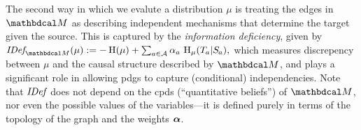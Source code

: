 \documentclass[twoside]{article}
\begin{document}
The second way in which we evalute a distribution $\mu$ is
treating the edges in ${\dg M}$ as describing independent mechanisms
that determine the target given the source.
This is captured by the \emph{information deficiency}, given by
$
    \IDef{\dg M}(\mu) := - \H(\mu) + \sum_{a \in \Ar} \alpha_a\, \H_\mu(\Tgt a | \Src a),
$
which
measures discrepency between $\mu$ and the causal structure described by $\dg M$,
    and plays a significant role in allowing pdgs to capture (conditional) independencies.
Note that $\mathit{IDef}_{\!}$ does not depend on the cpds (``quantitative beliefs'') of $\dg M$, nor even the possible values of the variables---it is defined purely in terms of the topology of the graph and the weights $\boldsymbol\alpha$.
\end{document}
